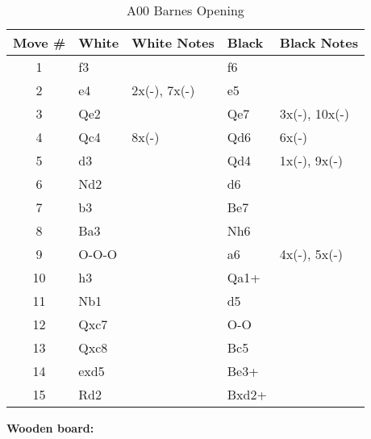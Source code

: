\begin{table}[htbp]
\centering
\scriptsize
\caption[]{A00 Barnes Opening}
\begin{tabular}{|c|l|p{5cm}|l|p{5cm}|}
\hline
\textbf{Move \#} & \textbf{White} & \textbf{White Notes} & \textbf{Black} & \textbf{Black Notes} \\
\hline
1  & f3    &                     & f6    &                        \\
2  & e4    & 2x(-), 7x(-)        & e5    &                        \\
3  & Qe2   &                     & Qe7   & 3x(-), 10x(-)           \\
4  & Qc4   & 8x(-)               & Qd6   & 6x(-)                   \\
5  & d3    &                     & Qd4   & 1x(-), 9x(-)            \\
6  & Nd2   &                     & d6    &                        \\
7  & b3    &                     & Be7   &                        \\
8  & Ba3   &                     & Nh6   &                        \\
9  & O-O-O &                     & a6    & 4x(-), 5x(-)            \\
10 & h3    &                     & Qa1+  &                        \\
11 & Nb1   &                     & d5    &                        \\
12 & Qxc7  &                     & O-O   &                        \\
13 & Qxc8  &                     & Bc5   &                        \\
14 & exd5  &                     & Be3+  &                        \\
15 & Rd2   &                     & Bxd2+ &                        \\
\hline
\end{tabular}
\end{table}

\newpage


\begin{center}
\textbf{Wooden board:}
\end{center}

